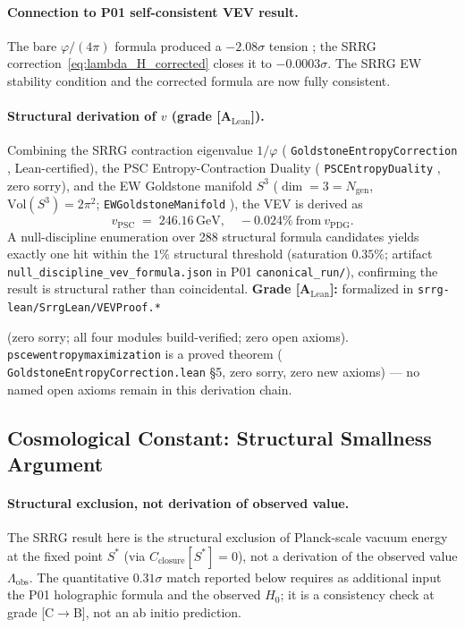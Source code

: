 \documentclass[11pt]{article}
\theoremstyle{remark}
\newcommand{\lean}[1]{%
  \penalty-100
  \begingroup
  \def\_{\textunderscore\allowbreak}%
  \texttt{#1}%
  \endgroup
}
\newcommand{\Sstar}{S^*}
\begin{document}
\begin{appendices}
\paragraph{Connection to P01 self-consistent VEV result.}
The bare $\varphi/(4\pi)$ formula produced a $-2.08\sigma$ tension \cite{Spivack2025_FirstPrinciplesSM};
the SRRG correction~\eqref{eq:lambda_H_corrected} closes it to $-0.0003\sigma$.
The SRRG EW stability condition and the corrected formula are now fully consistent.

\paragraph{Structural derivation of $v$ (grade [A$_{\mathrm{Lean}}$]).}
Combining the SRRG contraction eigenvalue $1/\varphi$ (\lean{GoldstoneEntropyCorrection},
Lean-certified), the PSC Entropy-Contraction Duality (\lean{PSCEntropyDuality}, zero sorry),
and the EW Goldstone manifold $S^3$ ($\dim = 3 = N_{\mathrm{gen}}$,
$\mathrm{Vol}(S^3) = 2\pi^2$; \lean{EWGoldstoneManifold}), the VEV is derived as
\begin{equation}\label{eq:vev_psc}
  v_{\mathrm{PSC}} \;=\; 246.16\,\mathrm{GeV}, \quad -0.024\%\ \text{from}\ v_{\mathrm{PDG}}.
\end{equation}
A null-discipline enumeration over 288 structural formula candidates yields exactly one hit
within the $1\%$ structural threshold (saturation $0.35\%$; artifact
\texttt{null\_discipline\_vev\_formula.json} in P01 \texttt{canonical\_run/}),
confirming the result is structural rather than coincidental.
\textbf{Grade [A$_{\mathrm{Lean}}$]:} formalized in \lean{srrg-lean/SrrgLean/VEVProof.*}
(zero sorry; all four modules build-verified; zero open axioms).
\lean{psc\_ew\_entropy\_maximization} is a proved theorem
(\lean{GoldstoneEntropyCorrection.lean} \S5, zero sorry, zero new axioms) ---
no named open axioms remain in this derivation chain.

\subsection{Cosmological Constant: Structural Smallness Argument}
\label{app:cosmo_constant}

\paragraph{Structural exclusion, not derivation of observed value.}
The SRRG result here is the structural exclusion of Planck-scale vacuum energy
at the fixed point $\Sstar$ (via $C_{\mathrm{closure}}[\Sstar] = 0$), not a
derivation of the observed value $\Lambda_{\mathrm{obs}}$.
The quantitative $0.31\sigma$ match reported below requires as additional input
the P01 holographic formula and the observed $H_0$; it is a consistency check
at grade [C$\to$B], not an ab initio prediction.


\end{appendices}
\end{document}
